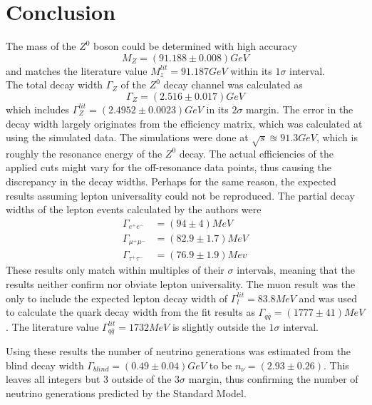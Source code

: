 \newpage
\section{Conclusion}
The mass of the $Z^0$ boson could be determined with high accuracy
\begin{equation*}
	M_Z=\unit{(91.188\pm0.008)}{GeV}
\end{equation*}
and matches the literature value $M_z^{lit}=\unit{91.187}{GeV}$ \cite{muenchen} within its $1\sigma$ interval.\\
The total decay width $\Gamma_Z$ of the $Z^0$ decay channel was calculated as
\begin{equation*}
\Gamma_Z=\unit{(2.516\pm0.017)}{GeV}
\end{equation*}
which includes $\Gamma_Z^{lit}=\unit{(2.4952\pm0.0023)}{GeV}$ \cite{jakobs} in its $2\sigma$ margin. The error in the decay width largely originates from the efficiency matrix, which was calculated at using the simulated data. The simulations were done at $\sqrt{s}\approxeq\unit{91.3}{GeV}$, which is roughly the resonance energy of the $Z^0$ decay. The actual efficiencies of the applied cuts might vary for the off-resonance data points, thus causing the discrepancy in the decay widths.
Perhaps for the same reason, the expected results assuming lepton universality could not be reproduced. The partial decay widths of the lepton events calculated by the authors were 
\begin{equation*}
\begin{aligned}
\Gamma_{e^+e^-}&=\unit{(94\pm4)}{MeV}\\
\Gamma_{\mu^+\mu^-}&=\unit{(82.9\pm1.7)}{MeV}\\
\Gamma_{\tau^+\tau^-}&=\unit{(76.9\pm1.9)}{Mev}
\end{aligned}
\end{equation*}
These results only match within multiples of their $\sigma$ intervals, meaning that the results neither confirm nor obviate lepton universality. The muon result was the only to include the expected lepton decay width of $\Gamma_l^{lit}=\unit{83.8}{MeV}$ \cite{staatsex} and was used to calculate the quark decay width from the fit results as $\Gamma_{q\overline{q}}=\unit{(1777\pm41)}{MeV}$. The literature value $\Gamma_{q\overline{q}}^{lit}=\unit{1732}{MeV}$ is slightly outside the $1\sigma$ interval.

Using these results the number of neutrino generations was estimated from the blind decay width $\Gamma_{blind}=\unit{(0.49\pm0.04)}{GeV}$ to be $n_\nu=(2.93\pm0.26)$. This leaves all integers but 3 outside of the $3\sigma$ margin, thus confirming the number of neutrino generations predicted by the Standard Model.